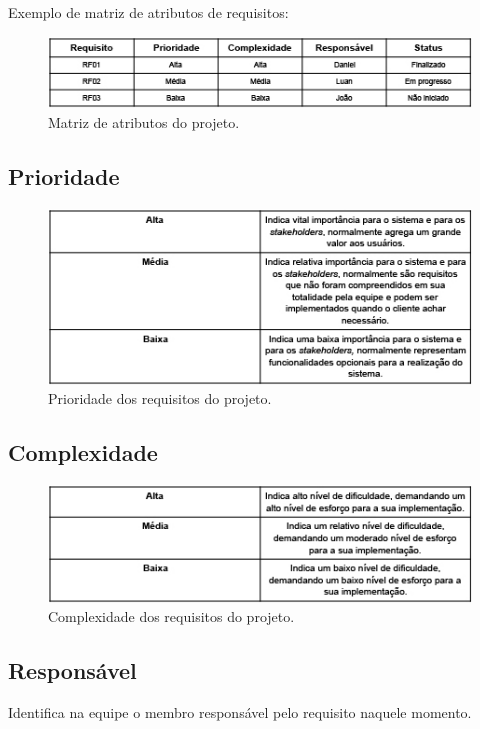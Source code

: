   Exemplo de matriz de atributos de requisitos:
    \begin{figure}[!htbp]
    \centering
    \includegraphics[scale=0.65]{figuras/matriz_atributos}
    \caption[Matriz de atributos do projeto.]{Matriz de atributos do projeto. \footnotemark}
    \label{tabela_matriz_atributos}
  \end{figure}
\subsection{Prioridade}
  \begin{figure}[!htbp]
    \centering
    \includegraphics[scale=0.5]{figuras/tabela_prioridade}
    \caption[Prioridade dos requisitos do projeto.]{Prioridade dos requisitos do projeto. \footnotemark}
    \label{tabela_prioridade}
  \end{figure}
\subsection{Complexidade}
  \begin{figure}[!htbp]
    \centering
    \includegraphics[scale=0.5]{figuras/tabela_complexidade}
    \caption[Complexidade dos requisitos do projeto.]{Complexidade dos requisitos do projeto. \footnotemark}
    \label{tabela_complexidade}
  \end{figure}
\subsection{Responsável}
Identifica na equipe o membro responsável pelo requisito naquele momento.
